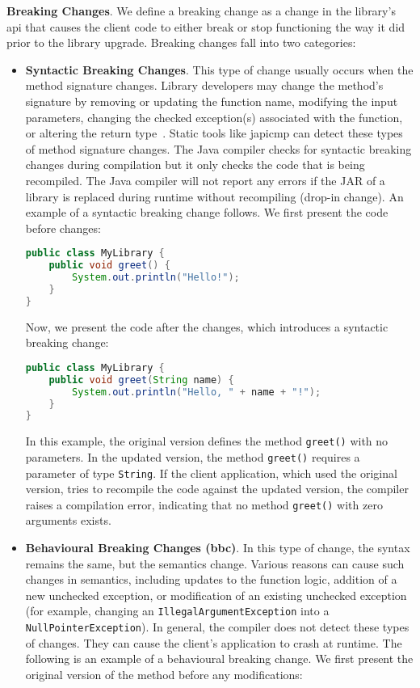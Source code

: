 \textbf{Breaking Changes}. We define a breaking change as a change in the library's \gls{api} that
causes the client code to either break or stop functioning the way it did prior to the library upgrade.
Breaking changes fall into two categories:
\begin{itemize}
    \item \textbf{Syntactic Breaking Changes}. This type of change usually occurs when the method
    signature changes. Library developers may change the method's signature by removing or updating
    the function name, modifying the input parameters, changing the checked exception(s) associated
    with the function, or altering the return type~\cite{jayasuriya24}. Static tools like japicmp
    can detect these types of method signature changes. The Java compiler checks for syntactic breaking
    changes during compilation but it only checks the code that is being recompiled. The Java compiler
    will not report any errors if the JAR of a library is replaced during runtime without recompiling
    (drop-in change). An example of a syntactic breaking change follows. We first present the
    code before changes:
    \begin{lstlisting}[language=java]
public class MyLibrary {
    public void greet() {
        System.out.println("Hello!");
    }
}
    \end{lstlisting}
    Now, we present the code after the changes, which introduces a syntactic breaking change:
    \begin{lstlisting}[language=java]
public class MyLibrary {
    public void greet(String name) {
        System.out.println("Hello, " + name + "!");
    }
}
    \end{lstlisting}
    In this example, the original version defines the method \texttt{greet()} with no parameters. In
    the updated version, the method \texttt{greet()} requires a parameter of type \texttt{String}. If
    the client application, which used the original version, tries to recompile the code against the
    updated version, the compiler raises a compilation error, indicating that no method
    \texttt{greet()} with zero arguments exists.

    \item \textbf{Behavioural Breaking Changes (\gls{bbc})}. In this type of change, the syntax remains
    the same, but the semantics change. Various reasons can cause such changes in semantics, including
    updates to the function logic, addition of a new unchecked exception, or modification of an existing
    unchecked exception (for example, changing an \texttt{IllegalArgumentException} into a
    \texttt{NullPointerException}). In general, the compiler does not detect these types of changes.
    They can cause the client's application to crash at runtime. The following is an example of a
    behavioural breaking change. We first present the original version of the method before any modifications:


\end{itemize}
